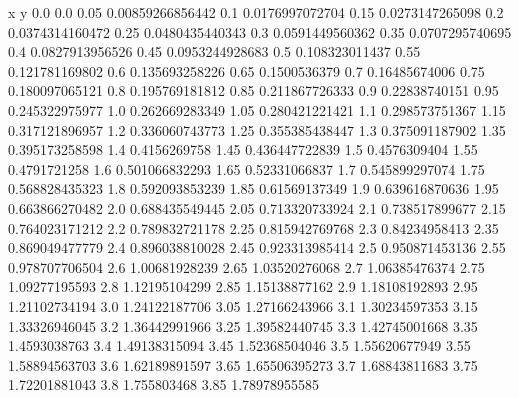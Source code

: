               x                y
            0.0              0.0
           0.05  0.00859266856442
            0.1  0.0176997072704
           0.15  0.0273147265098
            0.2  0.0374314160472
           0.25  0.0480435440343
            0.3  0.0591449560362
           0.35  0.0707295740695
            0.4  0.0827913956526
           0.45  0.0953244928683
            0.5   0.108323011437
           0.55   0.121781169802
            0.6   0.135693258226
           0.65     0.1500536379
            0.7    0.16485674006
           0.75   0.180097065121
            0.8   0.195769181812
           0.85   0.211867726333
            0.9    0.22838740151
           0.95   0.245322975977
            1.0   0.262669283349
           1.05   0.280421221421
            1.1   0.298573751367
           1.15   0.317121896957
            1.2   0.336060743773
           1.25   0.355385438447
            1.3   0.375091187902
           1.35   0.395173258598
            1.4     0.4156269758
           1.45   0.436447722839
            1.5     0.4576309404
           1.55     0.4791721258
            1.6   0.501066832293
           1.65    0.52331066837
            1.7   0.545899297074
           1.75   0.568828435323
            1.8   0.592093853239
           1.85    0.61569137349
            1.9   0.639616870636
           1.95   0.663866270482
            2.0   0.688435549445
           2.05   0.713320733924
            2.1   0.738517899677
           2.15   0.764023171212
            2.2   0.789832721178
           2.25   0.815942769768
            2.3    0.84234958413
           2.35   0.869049477779
            2.4   0.896038810028
           2.45   0.923313985414
            2.5   0.950871453136
           2.55   0.978707706504
            2.6    1.00681928239
           2.65    1.03520276068
            2.7    1.06385476374
           2.75    1.09277195593
            2.8    1.12195104299
           2.85    1.15138877162
            2.9    1.18108192893
           2.95    1.21102734194
            3.0    1.24122187706
           3.05    1.27166243966
            3.1    1.30234597353
           3.15    1.33326946045
            3.2    1.36442991966
           3.25    1.39582440745
            3.3    1.42745001668
           3.35     1.4593038763
            3.4    1.49138315094
           3.45    1.52368504046
            3.5    1.55620677949
           3.55    1.58894563703
            3.6    1.62189891597
           3.65    1.65506395273
            3.7    1.68843811683
           3.75    1.72201881043
            3.8      1.755803468
           3.85    1.78978955585
